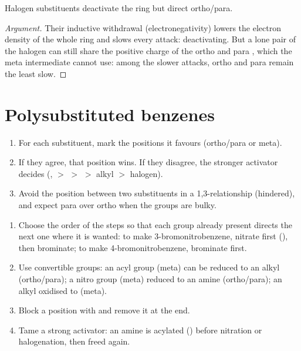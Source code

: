 \begin{proposition}[Halogens]\label{prop:b2:aromatic-substitution:halogens}
Halogen substituents deactivate the ring but direct ortho/para.
\end{proposition}

\begin{proof}[Argument]
Their inductive withdrawal (electronegativity) lowers the electron density of the whole ring
and slows every attack: deactivating. But a lone pair of the halogen can still share the
positive charge of the ortho and para , which the meta intermediate cannot
use: among the slower attacks, ortho and para remain the least slow.
\end{proof}

\section{Polysubstituted benzenes}

\begin{method}\label{met:b2:aromatic-substitution:predict-position}
\begin{enumerate}
  \item For each substituent, mark the positions it favours (ortho/para or meta).
  \item If they agree, that position wins. If they disagree, the stronger activator decides
        (,  $>$  $>$  $>$ alkyl $>$ halogen).
  \item Avoid the position between two substituents in a 1,3-relationship (hindered), and
        expect para over ortho when the groups are bulky.
\end{enumerate}
\end{method}

\begin{method}\label{met:b2:aromatic-substitution:plan-aromatic}
\begin{enumerate}
  \item Choose the order of the steps so that each group already present directs the next one
        where it is wanted: to make 3-bromonitrobenzene, nitrate first (), then
        brominate; to make 4-bromonitrobenzene, brominate first.
  \item Use convertible groups: an acyl group (meta) can be reduced to an alkyl (ortho/para);
        a nitro group (meta) reduced to an amine (ortho/para); an alkyl oxidised to
         (meta).
  \item Block a position with  and remove it at the end.
  \item Tame a strong activator: an amine is acylated () before nitration or
        halogenation, then freed again.
\end{enumerate}
\end{method}

